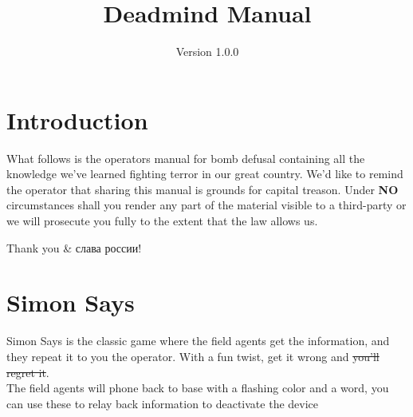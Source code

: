 \documentclass{article}
\title{Deadmind Manual}
\date{Version 1.0.0}
\begin{document}
\BgThispage

\maketitle

\section* {Introduction}
What follows is the operators manual for bomb defusal containing all the knowledge we've learned fighting terror in our great country. We'd like to remind the operator that sharing this manual is grounds for capital treason. Under \textbf{NO} circumstances shall you render any part of the material visible to a third-party or we will prosecute you fully to the extent that the law allows us.

Thank you \& слава россии!
\thispagestyle{empty}
\newpage
\BgThispage
\thispagestyle{empty}
\section* {Simon Says}

Simon Says is the classic game where the field agents get the information, and they repeat it to you the operator. With a fun twist, get it wrong and \st{you'll regret it}.\\

The field agents will phone back to base with a flashing color and a word, you can use these to relay back information to deactivate the device
\end{document}
